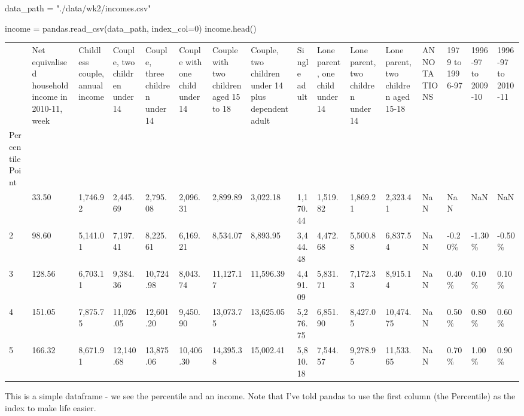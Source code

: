 \documentclass[
  letterpaper,
  DIV=11,
  numbers=noendperiod]{scrreprt}
\newenvironment{Shaded}{\begin{snugshade}}{\end{snugshade}}
\newcommand{\DecValTok}[1]{\textcolor[rgb]{0.68,0.00,0.00}{#1}}
\newcommand{\NormalTok}[1]{\textcolor[rgb]{0.00,0.23,0.31}{#1}}
\newcommand{\OperatorTok}[1]{\textcolor[rgb]{0.37,0.37,0.37}{#1}}
\newcommand{\StringTok}[1]{\textcolor[rgb]{0.13,0.47,0.30}{#1}}
\begin{document}
\begin{Shaded}
\begin{Highlighting}[]
\NormalTok{data\_path }\OperatorTok{=} \StringTok{"./data/wk2/incomes.csv"}

\NormalTok{income }\OperatorTok{=}\NormalTok{  pandas.read\_csv(data\_path, index\_col}\OperatorTok{=}\DecValTok{0}\NormalTok{)}
\NormalTok{income.head()}
\end{Highlighting}
\end{Shaded}

\begin{longtable}[]{@{}llllllllllllllll@{}}
\toprule\noalign{}
& Net equivalised household income in 2010-11, week & Childless couple,
annual income & Couple, two children under 14 & Couple, three children
under 14 & Couple with one child under 14 & Couple with two children
aged 15 to 18 & Couple, two children under 14 plus dependent adult &
Single adult & Lone parent, one child under 14 & Lone parent, two
children under 14 & Lone parent, two children aged 15-18 & ANNOTATIONS &
1979 to 1996-97 & 1996-97 to 2009-10 & 1996-97 to 2010-11 \\
Percentile Point & & & & & & & & & & & & & & & \\
\midrule\noalign{}
\endhead
\bottomrule\noalign{}
\endlastfoot
1 & 33.50 & 1,746.92 & 2,445.69 & 2,795.08 & 2,096.31 & 2,899.89 &
3,022.18 & 1,170.44 & 1,519.82 & 1,869.21 & 2,323.41 & NaN & NaN & NaN &
NaN \\
2 & 98.60 & 5,141.01 & 7,197.41 & 8,225.61 & 6,169.21 & 8,534.07 &
8,893.95 & 3,444.48 & 4,472.68 & 5,500.88 & 6,837.54 & NaN & -0.20\% &
-1.30\% & -0.50\% \\
3 & 128.56 & 6,703.11 & 9,384.36 & 10,724.98 & 8,043.74 & 11,127.17 &
11,596.39 & 4,491.09 & 5,831.71 & 7,172.33 & 8,915.14 & NaN & 0.40\% &
0.10\% & 0.10\% \\
4 & 151.05 & 7,875.75 & 11,026.05 & 12,601.20 & 9,450.90 & 13,073.75 &
13,625.05 & 5,276.75 & 6,851.90 & 8,427.05 & 10,474.75 & NaN & 0.50\% &
0.80\% & 0.60\% \\
5 & 166.32 & 8,671.91 & 12,140.68 & 13,875.06 & 10,406.30 & 14,395.38 &
15,002.41 & 5,810.18 & 7,544.57 & 9,278.95 & 11,533.65 & NaN & 0.70\% &
1.00\% & 0.90\% \\
\end{longtable}

This is a simple dataframe - we see the percentile and an income. Note
that I've told pandas to use the first column (the Percentile) as the
index to make life easier.
\end{document}
